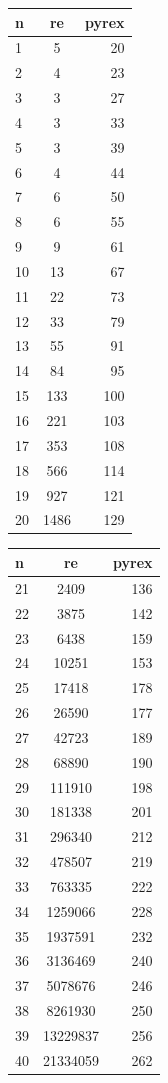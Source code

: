 \documentclass[a4paper,12pt,oneside,onecolumn]{uerj}
\begin{document}
\begin{center}
	\vline
	\begin{tabular}{ l || c | r }
		{\bf n} & {\bf re} & {\bf pyrex} \\
		\hline 
		1 & 5 & 20  \\ 
		2 & 4 & 23 \\ 
		3 & 3 & 27 \\ 
		4 & 3 & 33 \\ 
		5 & 3 & 39 \\ 
		6 & 4 & 44 \\ 
		7 & 6 & 50 \\ 
		8 & 6 & 55 \\ 
		9 & 9 & 61 \\ 
		10 & 13 & 67 \\ 
		11 & 22 & 73 \\ 
		12 & 33 & 79 \\ 
		13 & 55 & 91 \\ 
		14 & 84 & 95 \\ 
		15 & 133 & 100 \\ 
		16 & 221 & 103 \\ 
		17 & 353 & 108 \\ 
		18 & 566 & 114 \\ 
		19 & 927 & 121 \\ 
		20 & 1486 & 129 \\ 
	\end{tabular}
	\vline
	\quad
	\vline
	\begin{tabular}{ l || c | r }
		{\bf n} & {\bf re} & {\bf pyrex} \\
		\hline 
		21 & 2409 & 136 \\ 
		22 & 3875 & 142 \\ 
		23 & 6438 & 159 \\ 
		24 & 10251 & 153 \\ 
		25 & 17418 & 178 \\ 
		26 & 26590 & 177 \\ 
		27 & 42723 & 189 \\ 
		28 & 68890 & 190 \\ 
		29 & 111910 & 198 \\ 
		30 & 181338 & 201 \\ 
		31 & 296340 & 212 \\ 
		32 & 478507 & 219 \\ 
		33 & 763335 & 222 \\ 
		34 & 1259066 & 228 \\ 
		35 & 1937591 & 232 \\ 
		36 & 3136469 & 240 \\ 
		37 & 5078676 & 246 \\ 
		38 & 8261930 & 250 \\ 
		39 & 13229837 & 256 \\ 
		40 & 21334059 & 262 \\
	\end{tabular}
	\vline
\end{center}
\end{document}
